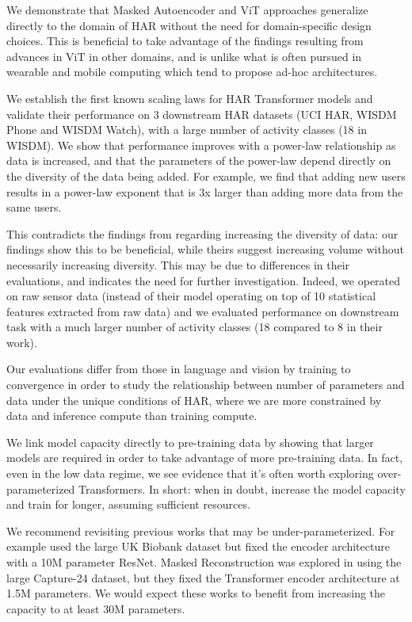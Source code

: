 We demonstrate that Masked Autoencoder and ViT approaches generalize directly to the domain of HAR without the need for domain-specific design choices. This is beneficial to take advantage of the findings resulting from advances in ViT in other domains, and is unlike what is often pursued in wearable and mobile computing which tend to propose ad-hoc architectures.

We establish the first known scaling laws for HAR Transformer models and validate their performance on 3 downstream HAR datasets (UCI HAR, WISDM Phone and WISDM Watch), with a large number of activity classes (18 in WISDM). We show that performance improves with a power-law relationship as data is increased, and that the parameters of the power-law depend directly on the diversity of the data being added. 
For example, we find that adding new users results in a power-law exponent that is 3x larger than adding more data from the same users. 

This contradicts the findings from  \cite{narayanswamy2024scalingwearablefoundationmodels} regarding increasing the diversity of data: our findings show this to be beneficial, while theirs suggest increasing volume without necessarily increasing diversity. 
This may be due to differences in their evaluations, and indicates the need for further investigation.
Indeed, we operated on raw sensor data (instead of their model operating on top of 10 statistical features extracted from raw data) and we evaluated performance on downstream task with a much larger number of activity classes (18 compared to 8 in their work).

Our evaluations differ from those in language and vision  by training to convergence in order to study the relationship between number of parameters and data under the unique conditions of HAR, where we are more constrained by data and inference compute than training compute.

We link model capacity directly to pre-training data by showing that larger models are required in order to take advantage of more pre-training data. In fact, even in the low data regime, we see evidence that it's often worth exploring over-parameterized Transformers. In short: when in doubt, increase the model capacity and train for longer, assuming sufficient resources.

We recommend revisiting previous works that may be under-parameterized. For example \cite{SSLUKbiobank} used the large UK Biobank dataset but fixed the encoder architecture with a 10M parameter ResNet. Masked Reconstruction \cite{HARmaskedreconstruction} was explored in \cite{assessingSSLHAR22} using the large Capture-24 \cite{capture24} dataset, but they fixed the Transformer encoder architecture at 1.5M parameters. We would expect these works to benefit from increasing the capacity to at least 30M parameters.

